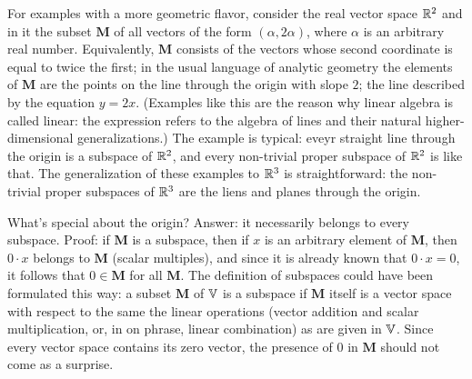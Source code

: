 For examples with a more geometric flavor, consider the real vector space $\mathbb{R}^2$ and in it the subset $\mathbf{M}$ of all vectors of the form $(\alpha, 2\alpha)$, where $\alpha$ is an arbitrary real number. Equivalently, $\mathbf{M}$ consists of the vectors whose second coordinate is equal to twice the first; in the usual language of analytic geometry the elements of $\mathbf{M}$ are the points on the line through the origin with slope $2$; the line described by the equation $y=2x$. (Examples like this are the reason why linear algebra is called linear: the expression refers to the algebra of lines and their natural higher-dimensional generalizations.) The example is typical: eveyr straight line through the origin is a subspace of $\mathbb{R}^2$, and every non-trivial proper subspace of $\mathbb{R}^2$ is like that. The generalization of these examples to $\mathbb{R}^3$ is straightforward: the non-trivial proper subspaces of $\mathbb{R}^3$ are the liens and planes through the origin.

What's special about the origin? Answer: it necessarily belongs to every subspace. Proof: if $\mathbf{M}$ is a subspace, then if $x$ is an arbitrary element of $\mathbf{M}$, then $0 \cdot x$ belongs to $\mathbf{M}$ (scalar multiples), and since it is already known that $0 \cdot x = 0$, it follows that $0 \in \mathbf{M}$ for all $\mathbf{M}$. The definition of subspaces could have been formulated this way: a subset $\mathbf{M}$ of $\mathbb{V}$ is a subspace if $\mathbf{M}$ itself is a vector space with respect to the same the linear operations (vector addition and scalar multiplication, or, in on phrase, linear combination) as are given in $\mathbb{V}$. Since every vector space contains its zero vector, the presence of $0$ in $\mathbf{M}$ should not come as a surprise.

